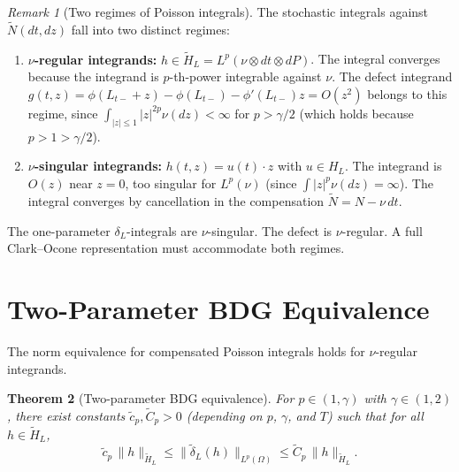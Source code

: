 \documentclass[11pt,a4paper]{article}
\theoremstyle{plain}
\newtheorem{theorem}{Theorem}[section]
\theoremstyle{definition}
\theoremstyle{remark}
\newtheorem{remark}[theorem]{Remark}
\begin{document}
\begin{remark}[Two regimes of Poisson integrals]
\label{rem:two-regimes}
The stochastic integrals against $\widetilde{N}(dt,dz)$ fall
into two distinct regimes:
\begin{enumerate}[label=(\roman*)]
\item \textbf{$\nu$-regular integrands:}
  $h \in \widetilde{H}_L = L^p(\nu\otimes dt\otimes dP)$.
  The integral converges because the integrand is
  $p$-th-power integrable against $\nu$.  The defect integrand
  $g(t,z) = \phi(L_{t-}+z) - \phi(L_{t-}) - \phi'(L_{t-})z
  = O(z^2)$ belongs to this regime, since
  $\int_{|z|\leq 1}|z|^{2p}\nu(dz) < \infty$ for
  $p > \gamma/2$ (which holds because $p > 1 > \gamma/2$).
\item \textbf{$\nu$-singular integrands:}
  $h(t,z) = u(t)\cdot z$ with $u \in H_L$.  The integrand
  is $O(z)$ near $z = 0$, too singular for $L^p(\nu)$
  (since $\int|z|^p\nu(dz) = \infty$).  The integral
  converges by cancellation in the compensation
  $\widetilde{N} = N - \nu\,dt$.
\end{enumerate}
The one-parameter $\delta_L$-integrals are $\nu$-singular.
The defect is $\nu$-regular.  A full Clark--Ocone
representation must accommodate both regimes.
\end{remark}


\section{Two-Parameter BDG Equivalence}\label{sec:BDG}

The norm equivalence for compensated Poisson integrals
holds for $\nu$-regular integrands.

\begin{theorem}[Two-parameter BDG equivalence]
\label{thm:two-param-BDG}
For $p \in (1,\gamma)$ with $\gamma \in (1,2)$, there exist
constants $\tilde{c}_p, \tilde{C}_p > 0$ (depending on $p$,
$\gamma$, and $T$) such that for all
$h \in \widetilde{H}_L$,
\begin{equation}\label{eq:two-param-BDG}
  \tilde{c}_p\,\|h\|_{\widetilde{H}_L}
  \leq \|\widetilde{\delta}_L(h)\|_{L^p(\Omega)}
  \leq \tilde{C}_p\,\|h\|_{\widetilde{H}_L}.
\end{equation}
\end{theorem}
\end{document}
